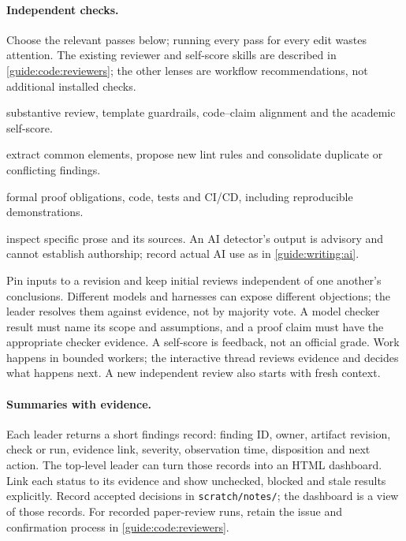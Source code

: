 \paragraph{Independent checks.} Choose the relevant passes below; running every pass for every edit wastes attention. The existing reviewer and self-score skills are described in \cref{guide:code:reviewers}; the other lenses are workflow recommendations, not additional installed checks.
\begin{description}[noitemsep]
  \item[Paper:] substantive review, template guardrails, code--claim alignment and the academic self-score.
  \item[Reuse:] extract common elements, propose new lint rules and consolidate duplicate or conflicting findings.
  \item[Artifacts:] formal proof obligations, code, tests and CI/CD, including reproducible demonstrations.
  \item[AI-style concerns:] inspect specific prose and its sources. An AI detector's output is advisory and cannot establish authorship; record actual AI use as in \cref{guide:writing:ai}.
\end{description}
Pin inputs to a revision and keep initial reviews independent of one another's conclusions. Different models and harnesses can expose different objections; the leader resolves them against evidence, not by majority vote. A model checker result must name its scope and assumptions, and a proof claim must have the appropriate checker evidence. A self-score is feedback, not an official grade. Work happens in bounded workers; the interactive thread reviews evidence and decides what happens next. A new independent review also starts with fresh context.

\paragraph{Summaries with evidence.} Each leader returns a short findings record: finding ID, owner, artifact revision, check or run, evidence link, severity, observation time, disposition and next action. The top-level leader can turn those records into an HTML dashboard. Link each status to its evidence and show unchecked, blocked and stale results explicitly. Record accepted decisions in \texttt{scratch/notes/}; the dashboard is a view of those records. For recorded paper-review runs, retain the issue and confirmation process in \cref{guide:code:reviewers}.

